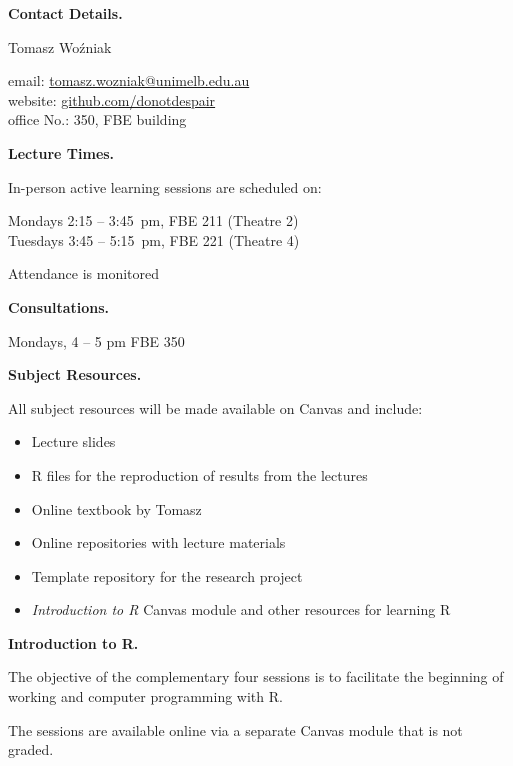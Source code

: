 \documentclass[10pt]{article}
\begin{document}
\bigskip\begin{multicols}{2}

\vspace{0.3cm}\noindent\textbf{Contact Details.} 

\smallskip\indent Tomasz Wo\'zniak 

\smallskip\indent email: \href{mailto:tomasz.wozniak@unimelb.edu.au}{tomasz.wozniak@unimelb.edu.au}\\
\indent website: \href{https://github.com/donotdespair}{github.com/donotdespair}\\
\indent office No.: 350, FBE building


\bigskip\noindent\textbf{Lecture Times.}

\smallskip\noindent In-person active learning sessions are scheduled on:

\smallskip\indent Mondays 2:15 -- 3:45~pm, FBE 211 (Theatre 2) \\
\indent Tuesdays 3:45 -- 5:15~pm, FBE 221 (Theatre 4)

\smallskip\noindent Attendance is monitored

\bigskip\noindent\textbf{Consultations.} 

\smallskip\indent Mondays, 4 -- 5 pm FBE 350


\bigskip\noindent\textbf{Subject Resources.}

\smallskip\noindent All subject resources will be made available on Canvas and include:
\begin{itemize}[itemsep=0pt]
\item Lecture slides
\item R files for the reproduction of results from the lectures
\item Online textbook by Tomasz
\item Online repositories with lecture materials
\item Template repository for the research project
\item \textit{Introduction to R} Canvas module and other resources for learning R
\end{itemize}


\bigskip\noindent\textbf{Introduction to R.} 

\smallskip\noindent The objective of the complementary four sessions is to facilitate the beginning of working and computer programming with R. 

\smallskip\noindent The sessions are available online via a separate Canvas module that is not graded. 


\end{multicols}
\end{document}
